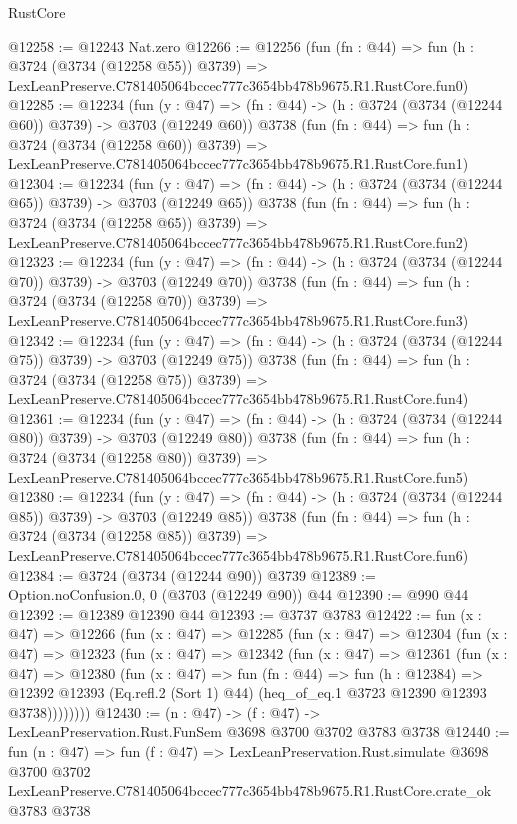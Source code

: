 \begin{lexlean}{RustCore}
\begin{coremodule}
@12258 := @12243 Nat.zero
@12266 := @12256
    (fun (fn : @44) =>
    fun (h : @3724 (@3734 (@12258 @55)) @3739) =>
    LexLeanPreserve.C781405064bccec777c3654bb478b9675.R1.RustCore.fun0)
@12285 := @12234
    (fun (y : @47) => (fn : @44) -> (h : @3724 (@3734 (@12244 @60)) @3739) -> @3703 (@12249 @60))
    @3738
    (fun (fn : @44) =>
    fun (h : @3724 (@3734 (@12258 @60)) @3739) =>
    LexLeanPreserve.C781405064bccec777c3654bb478b9675.R1.RustCore.fun1)
@12304 := @12234
    (fun (y : @47) => (fn : @44) -> (h : @3724 (@3734 (@12244 @65)) @3739) -> @3703 (@12249 @65))
    @3738
    (fun (fn : @44) =>
    fun (h : @3724 (@3734 (@12258 @65)) @3739) =>
    LexLeanPreserve.C781405064bccec777c3654bb478b9675.R1.RustCore.fun2)
@12323 := @12234
    (fun (y : @47) => (fn : @44) -> (h : @3724 (@3734 (@12244 @70)) @3739) -> @3703 (@12249 @70))
    @3738
    (fun (fn : @44) =>
    fun (h : @3724 (@3734 (@12258 @70)) @3739) =>
    LexLeanPreserve.C781405064bccec777c3654bb478b9675.R1.RustCore.fun3)
@12342 := @12234
    (fun (y : @47) => (fn : @44) -> (h : @3724 (@3734 (@12244 @75)) @3739) -> @3703 (@12249 @75))
    @3738
    (fun (fn : @44) =>
    fun (h : @3724 (@3734 (@12258 @75)) @3739) =>
    LexLeanPreserve.C781405064bccec777c3654bb478b9675.R1.RustCore.fun4)
@12361 := @12234
    (fun (y : @47) => (fn : @44) -> (h : @3724 (@3734 (@12244 @80)) @3739) -> @3703 (@12249 @80))
    @3738
    (fun (fn : @44) =>
    fun (h : @3724 (@3734 (@12258 @80)) @3739) =>
    LexLeanPreserve.C781405064bccec777c3654bb478b9675.R1.RustCore.fun5)
@12380 := @12234
    (fun (y : @47) => (fn : @44) -> (h : @3724 (@3734 (@12244 @85)) @3739) -> @3703 (@12249 @85))
    @3738
    (fun (fn : @44) =>
    fun (h : @3724 (@3734 (@12258 @85)) @3739) =>
    LexLeanPreserve.C781405064bccec777c3654bb478b9675.R1.RustCore.fun6)
@12384 := @3724 (@3734 (@12244 @90)) @3739
@12389 := Option.noConfusion.{0, 0} (@3703 (@12249 @90)) @44
@12390 := @990 @44
@12392 := @12389 @12390 @44
@12393 := @3737 @3783
@12422 := fun (x : @47) =>
  @12266
    (fun (x : @47) =>
    @12285
      (fun (x : @47) =>
      @12304
        (fun (x : @47) =>
        @12323
          (fun (x : @47) =>
          @12342
            (fun (x : @47) =>
            @12361
              (fun (x : @47) =>
              @12380
                (fun (x : @47) =>
                fun (fn : @44) =>
                fun (h : @12384) =>
                @12392
                  @12393
                  (Eq.refl.{2} (Sort 1) @44)
                  (heq_of_eq.{1} @3723 @12390 @12393 @3738))))))))
@12430 := (n : @47) -> (f : @47) -> LexLeanPreservation.Rust.FunSem @3698 @3700 @3702 @3783 @3738
@12440 := fun (n : @47) =>
  fun (f : @47) =>
  LexLeanPreservation.Rust.simulate
    @3698
    @3700
    @3702
    LexLeanPreserve.C781405064bccec777c3654bb478b9675.R1.RustCore.crate_ok
    @3783
    @3738
\end{coremodule}
\end{lexlean}
